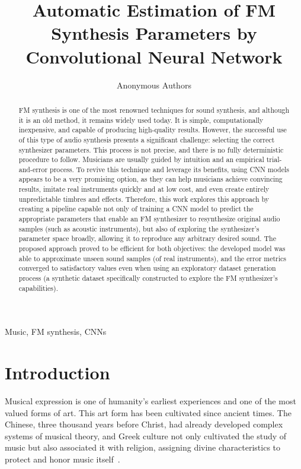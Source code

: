 \documentclass[10pt,conference]{IEEEtran}
\title{\LARGE \bf Automatic Estimation of FM Synthesis Parameters by Convolutional Neural Network}
\begin{document}
\author{Anonymous Authors}

\maketitle
\thispagestyle{empty}
\pagestyle{empty}

\begin{abstract}
FM synthesis is one of the most renowned techniques for sound synthesis, and although it is an old method, it remains widely used today. It is simple, computationally inexpensive, and capable of producing high-quality results. However, the successful use of this type of audio synthesis presents a significant challenge: selecting the correct synthesizer parameters. This process is not precise, and there is no fully deterministic procedure to follow. Musicians are usually guided by intuition and an empirical trial-and-error process. To revive this technique and leverage its benefits, using CNN models appears to be a very promising option, as they can help musicians achieve convincing results, imitate real instruments quickly and at low cost, and even create entirely unpredictable timbres and effects. Therefore, this work explores this approach by creating a pipeline capable not only of training a CNN model to predict the appropriate parameters that enable an FM synthesizer to resynthesize original audio samples (such as acoustic instruments), but also of exploring the synthesizer’s parameter space broadly, allowing it to reproduce any arbitrary desired sound. The proposed approach proved to be efficient for both objectives: the developed model was able to approximate unseen sound samples (of real instruments), and the error metrics converged to satisfactory values even when using an exploratory dataset generation process (a synthetic dataset specifically constructed to explore the FM synthesizer’s capabilities).
\end{abstract}

\begin{IEEEkeywords}
Music, FM synthesis, CNNs
\end{IEEEkeywords}


\section{Introduction}

Musical expression is one of humanity’s earliest experiences and one of the most valued forms of art. This art form has been cultivated since ancient times. The Chinese, three thousand years before Christ, had already developed complex systems of musical theory, and Greek culture not only cultivated the study of music but also associated it with religion, assigning divine characteristics to protect and honor music itself~\cite{med1996teoria}.
\end{document}
